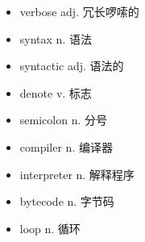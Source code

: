 \begin{multicols}{2}
    \begin{itemize}
        \item [1.]verbose adj. 冗长啰嗦的
        \item [2.]syntax n. 语法
        \item [3.]syntactic adj. 语法的
        \item [4.]denote v. 标志
        \item [5.]semicolon n. 分号
        \item [6.]compiler n. 编译器
        \item [7.]interpreter n. 解释程序
        \item [8.]bytecode n. 字节码
        \item [9.]loop n. 循环
    \end{itemize}
\end{multicols}
